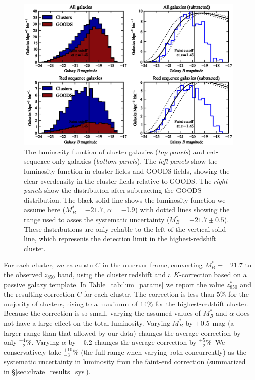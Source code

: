 \begin{figure}[tb]
\includegraphics[width=\textwidth]{figures/clrate/galproperties_lumfunc.eps}
\caption[Luminosity function of cluster galaxies]{The luminosity 
function of cluster galaxies (\emph{top panels}) and red-sequence-only
galaxies (\emph{bottom panels}). The \emph{left panels} show the luminosity function
in cluster fields and GOODS fields, showing the clear overdensity in
the cluster fields relative to GOODS. The \emph{right panels} show the
distribution after subtracting the GOODS distribution. The black solid
line shows the luminosity function we assume here ($M^\ast_B = -21.7$,
$\alpha=-0.9$) with dotted lines showing the range used to asses the
systematic uncertainty ($M^\ast_B = -21.7 \pm 0.5$). These
distributions are only reliable to the left of the vertical solid
line, which represents the detection limit in the highest-redshift
cluster.\label{fig:galproperties_lumfunc}}
\end{figure}

For each cluster, we calculate $C$ in the observer frame, converting
$M^\ast_B = -21.7$ to the observed $z_{850}$ band, using the cluster
redshift and a $K$-correction based on a passive galaxy template. In
Table~\ref{tab:lum_params} we report the value $z_{850}^\ast$ and the
resulting correction $C$ for each cluster. The correction is less than
$5\%$ for the majority of clusters, rising to a maximum of 14\% for
the highest-redshift cluster. Because the correction is so small,
varying the assumed values of $M^\ast_B$ and $\alpha$ does not have a
large effect on the total luminosity. Varying $M^\ast_B$ by $\pm
0.5$~mag (a larger range than that allowed by our data) changes the
average correction by only $^{+4}_{-2}\%$. Varying $\alpha$ by $\pm
0.2$ changes the average correction by $^{+5}_{-2}\%$. We
conservatively take $^{+10}_{-3}\%$ (the full range when varying both
concurrently) as the systematic uncertainty in luminosity from the
faint-end correction (summarized in \S\ref{sec:clrate_results_sys}).

